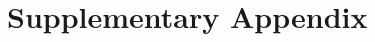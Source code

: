 \clearpage
{}
\setcounter{table}{0}
\renewcommand{\thetable}{O.\arabic{table}}
\setcounter{figure}{0}
\renewcommand{\thefigure}{O.\arabic{figure}}
\setcounter{footnote}{0}
\setcounter{proposition}{0}
\renewcommand{\theproposition}{O.\arabic{proposition}}
\appendix
\onehalfspacing
\part*{Supplementary Appendix}\label{OA_appendix}

\setcounter{page}{1}
\renewcommand{\thesection}{O\arabic{section}}
\setcounter{section}{0}


